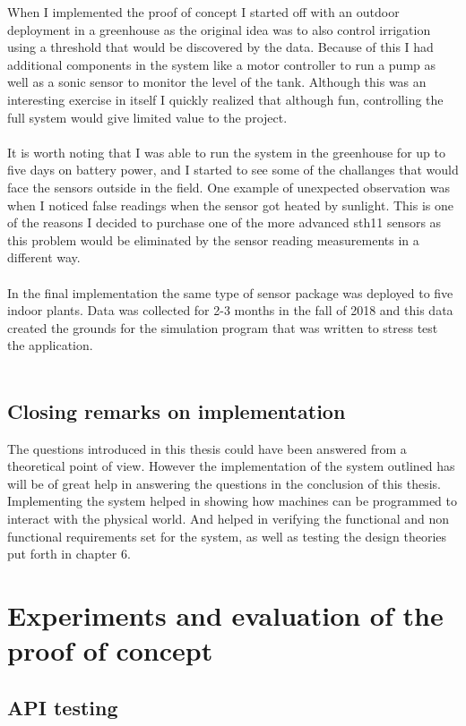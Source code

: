 \documentclass[]{uiophd}
\begin{document}
When I implemented the proof of concept I started off with an outdoor deployment in a greenhouse as the original idea was to also control irrigation using a threshold that would be discovered by the data. Because of this I had additional components in the system like a motor controller to run a pump as well as a sonic sensor to monitor the level of the tank. Although this was an interesting exercise in itself I quickly realized that although fun, controlling the full system would give limited value to the project.
\\\\
It is worth noting that I was able to run the system in the greenhouse for up to five days on battery power, and I started to see some of the challanges that would face the sensors outside in the field. One example of unexpected observation was when I noticed false readings when the sensor got heated by sunlight. This is one of the reasons I decided to purchase one of the more advanced sth11 sensors as this problem would be eliminated by the sensor reading measurements in a different way.
\\\\
In the final implementation the same type of sensor package was deployed to five indoor plants. Data was collected for 2-3 months in the fall of 2018 and this data created the grounds for the simulation program that was written to stress test the application.
\\\\
\section{Closing remarks on implementation}
The questions introduced in this thesis could have been answered from a theoretical point of view. However the implementation of the system outlined has will be of great help in answering the questions in the conclusion of this thesis. Implementing the system helped in showing how machines can be programmed to interact with the physical world. And helped in verifying the functional and non functional requirements set for the system, as well as testing the design theories put forth in chapter 6. 

\chapter{Experiments and evaluation of the proof of concept}

\section{API testing}
\end{document}
